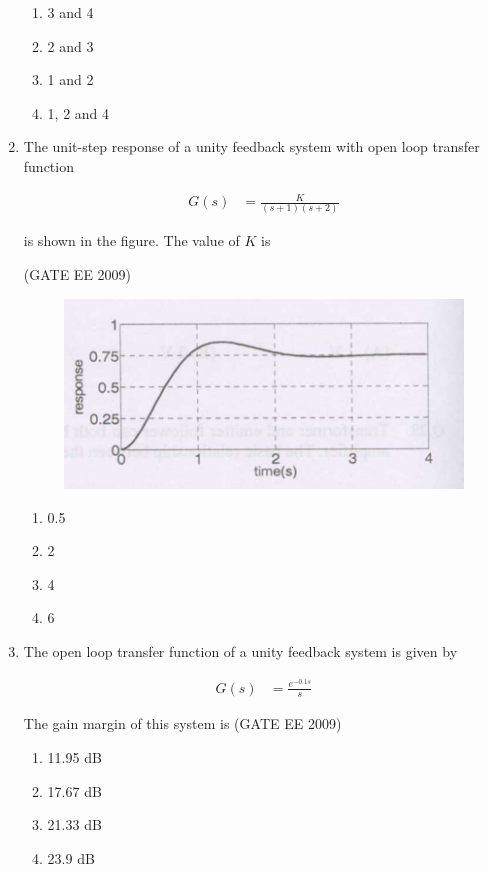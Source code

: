 \documentclass[journal,12pt,onecolumn]{IEEEtran}
\theoremstyle{remark}
\begin{document}
\begin{flushleft}
\begin{enumerate}
\begin{enumerate}
    \item 3 and 4
    \item 2 and 3
    \item 1 and 2
    \item 1, 2 and 4
\end{enumerate}

\item The unit-step response of a unity feedback system with open loop transfer function 

\begin{align*}
G(s)&= \frac{K}{(s+1)(s+2)}
\end{align*}

is shown in the figure. The value of $K$ is

\hfill(GATE EE 2009)
\begin{figure}[h!]
    \centering
    \includegraphics[width=0.5\columnwidth]{figs/Screenshot 2025-08-08 203002.png}
    \caption{}
    \label{fig:placeholder}
\end{figure}

\begin{enumerate}
    \item 0.5
    \item 2
    \item 4
    \item 6
\end{enumerate}


\item The open loop transfer function of a unity feedback system is given by

\begin{align*}
G(s)&= \frac{e^{-0.1s}}{s} 
\end{align*}

The gain margin of this system is
\hfill(GATE EE 2009)
\begin{enumerate}
    \item 11.95 dB
    \item 17.67 dB
    \item 21.33 dB
    \item 23.9 dB
\end{enumerate}


\end{enumerate}
\end{flushleft}
\end{document}
